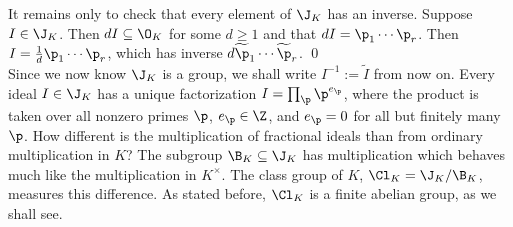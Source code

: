 \pf It remains only to check that every element of $\J_K$ has an inverse. Suppose $I \in \J_K$. Then $dI \subseteq \O_K$ for some $d \geq 1$ and that $dI=\p_1\cdots\p_r$. Then $I= \frac{1}{d} \p_1 \cdots \p_r$, which has inverse $d \widetilde{\p}_1\cdots \widetilde{\p}_r$. \qed \\

Since we now know $\J_K$ is a group, we shall write $I^{-1}:= \widetilde{I}$ from now on. Every ideal $I \in \J_K$ has a unique factorization $I=\prod_\p \p^{e_\p}$, where the product is taken over all nonzero primes $\p$, $e_\p \in \Z$, and $e_\p=0$ for all but finitely many $\p$. How different is the multiplication of fractional ideals than from ordinary multiplication in $K$? The subgroup $\B_K \subseteq \J_K$ has multiplication which behaves much like the multiplication in $K^\times$. The class group of $K$, $\Cl_K= \J_K/\B_K$, measures this difference. As stated before, $\Cl_K$ is a finite abelian group, as we shall see. 


